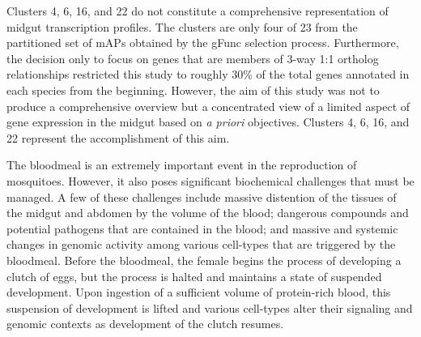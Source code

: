 
Clusters 4, 6, 16, and 22 do not constitute a comprehensive representation of midgut transcription profiles.
%
The clusters are only four of 23 from the partitioned set of \glspl{mAP} obtained by the \gls{gFunc} selection process.
%
Furthermore, the decision only to focus on genes that are members of 3-way 1:1 ortholog relationships restricted this study to roughly 30\% of the total genes annotated in each species from the beginning.
%
However, the aim of this study was not to produce a comprehensive overview but a concentrated view of a limited aspect of gene expression in the midgut based on \textit{a priori} objectives.
%
Clusters 4, 6, 16, and 22 represent the accomplishment of this aim.


The bloodmeal is an extremely important event in the reproduction of mosquitoes.
%
However, it also poses significant biochemical challenges that must be managed.
%
A few of these challenges include massive distention of the tissues of the midgut and abdomen by the volume of the blood; dangerous compounds and potential pathogens that are contained in the blood; and massive and systemic changes in genomic activity among various cell-types that are triggered by the bloodmeal.
%
Before the bloodmeal, the female begins the process of developing a clutch of eggs, but the process is halted and maintains a state of suspended development.
%
Upon ingestion of a sufficient volume of protein-rich blood, this suspension of development is lifted and various cell-types alter their signaling and genomic contexts as development of the clutch resumes.


